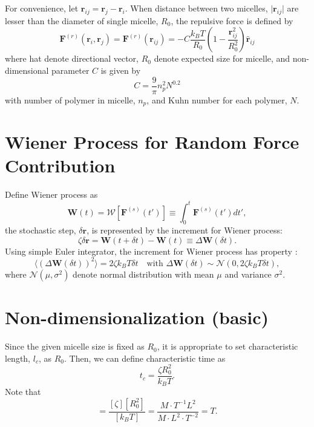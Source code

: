 \documentclass[10pt, a4paper]{article}
\begin{document}
For convenience, let $\mathbf{r}_{ij} = \mathbf{r}_j - \mathbf{r}_i$. When distance between two micelles, $\lvert\mathbf{r}_{ij}\rvert$ are lesser than the diameter of single micelle, $R_0$, the repulsive force is defined by
\begin{equation}
\mathbf{F}^{(r)}(\mathbf{r}_i, \mathbf{r}_j) = \mathbf{F}^{(r)}(\mathbf{r}_{ij}) = -C\frac{k_BT}{R_0}\left(1 - \frac{\mathbf{r}_{ij}^2}{R_0^2}\right)\hat{\mathbf{r}}_{ij} \label{eq:force_repulsion}
\end{equation}
where hat denote directional vector, $R_0$ denote expected size for micelle, and non-dimensional parameter $C$ is given by
\begin{equation}
C = \frac{9}{\pi}n_p^2N^{0.2}
\end{equation}
with number of polymer in micelle, $n_p$, and Kuhn number for each polymer, $N$.


\section{Wiener Process for Random Force Contribution}

Define Wiener process as
\begin{equation}
\mathbf{W}(t) = \mathscr{W}\left[\mathbf{F}^{(s)}(t')\right] \equiv \int_0^{t} \mathbf{F}^{(s)}(t')dt',
\end{equation}
the stochastic step, $\delta \mathbf{r}$, is represented by the increment for Wiener process:
\begin{equation}
\zeta \delta \mathbf{r} = \mathbf{W}(t+\delta t) - \mathbf{W}(t) \equiv \Delta \mathbf{W}(\delta t).
\end{equation}
Using simple Euler integrator, the increment for Wiener process has property \parencite{GREINER:1988cq}:
\begin{equation}
\langle (\Delta\mathbf{W}(\delta t))^2 \rangle = 2\zeta k_BT \delta t\quad\textrm{with }\Delta \mathbf{W}(\delta t) \sim \mathscr{N}(0, 2\zeta k_BT\delta t),\label{eq:increment_Wiener_process}
\end{equation}
where $\mathscr{N}(\mu, \sigma^2)$ denote normal distribution with mean $\mu$ and variance $\sigma^2$.


\section{Non-dimensionalization (basic)}
Since the given micelle size is fixed as $R_0$, it is appropriate to set characteristic length, $l_c$, as $R_0$. Then, we can define characteristic time as
\begin{equation}
t_c = \frac{\zeta R_0^2}{k_BT}.\label{eq:characteristic_time}
\end{equation}
Note that
\begin{equation}
[t_c] = \frac{[\zeta][R_0^2]}{[k_BT]} = \frac{M\cdot T^{-1} L^2}{M\cdot L^2\cdot T^{-2}} = T.
\end{equation}
\end{document}
